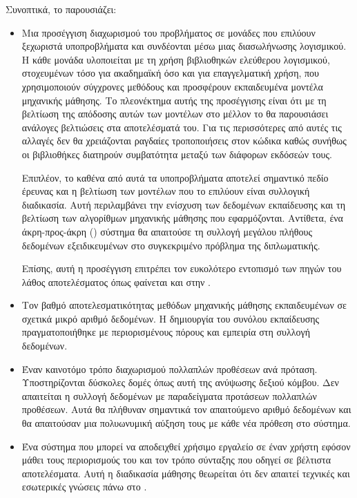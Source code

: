 Συνοπτικά, το \projectname{} παρουσιάζει:
\begin{itemize}
    \item Μια προσέγγιση διαχωρισμού του προβλήματος σε μονάδες που επιλύουν ξεχωριστά υποπροβλήματα και συνδέονται μέσω μιας διασωλήνωσης λογισμικού.
          Η κάθε μονάδα υλοποιείται με τη χρήση βιβλιοθηκών ελεύθερου λογισμικού, στοχευμένων τόσο για ακαδημαϊκή όσο και για επαγγελματική χρήση, που χρησιμοποιούν σύγχρονες μεθόδους και προσφέρουν εκπαιδευμένα μοντέλα μηχανικής μάθησης.
          Το πλεονέκτημα αυτής της προσέγγισης είναι ότι με τη βελτίωση της απόδοσης αυτών των μοντέλων στο μέλλον το \projectname{} θα παρουσιάσει ανάλογες βελτιώσεις στα αποτελέσματά του.
          Για τις περισσότερες από αυτές τις αλλαγές δεν θα χρειάζονται ραγδαίες τροποποιήσεις στον κώδικα καθώς συνήθως οι βιβλιοθήκες διατηρούν συμβατότητα μεταξύ των διάφορων εκδόσεών τους.

          Επιπλέον, το καθένα από αυτά τα υποπροβλήματα αποτελεί σημαντικό πεδίο έρευνας και η βελτίωση των μοντέλων που το επιλύουν είναι συλλογική διαδικασία.
          Αυτή περιλαμβάνει την ενίσχυση των δεδομένων εκπαίδευσης και τη βελτίωση των αλγορίθμων μηχανικής μάθησης που εφαρμόζονται.
          Αντίθετα, ένα άκρη-προς-άκρη () σύστημα θα απαιτούσε τη συλλογή μεγάλου πλήθους δεδομένων εξειδικευμένων στο συγκεκριμένο πρόβλημα της διπλωματικής.

          Επίσης, αυτή η προσέγγιση επιτρέπει τον ευκολότερο εντοπισμό των πηγών του λάθος αποτελέσματος όπως φαίνεται και στην .
    \item Τον βαθμό αποτελεσματικότητας μεθόδων μηχανικής μάθησης εκπαιδευμένων σε σχετικά μικρό αριθμό δεδομένων.
          Η δημιουργία του συνόλου εκπαίδευσης πραγματοποιήθηκε με περιορισμένους πόρους και εμπειρία στη συλλογή δεδομένων.
    \item Έναν καινοτόμο τρόπο διαχωρισμού πολλαπλών προθέσεων ανά πρόταση.
          Υποστηρίζονται δύσκολες δομές όπως αυτή της ανύψωσης δεξιού κόμβου.
          Δεν απαιτείται η συλλογή δεδομένων με παραδείγματα προτάσεων πολλαπλών προθέσεων.
          Αυτά θα πλήθυναν σημαντικά τον απαιτούμενο αριθμό δεδομένων και θα απαιτούσαν μια πολυωνυμική αύξηση τους με κάθε νέα πρόθεση στο σύστημα.
    \item Ένα σύστημα που μπορεί να αποδειχθεί χρήσιμο εργαλείο σε έναν χρήστη εφόσον μάθει τους περιορισμούς του και τον τρόπο σύνταξης που οδηγεί σε βέλτιστα αποτελέσματα.
          Αυτή η διαδικασία μάθησης θεωρείται ότι δεν απαιτεί τεχνικές και εσωτερικές γνώσεις πάνω στο \projectname{}.
\end{itemize}

